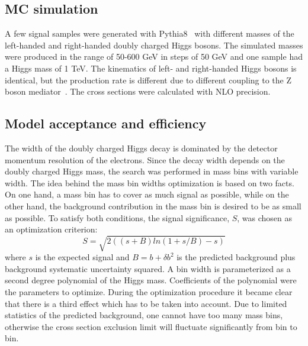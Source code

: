 \subsection{MC simulation}
A few signal samples were generated with Pythia8~\cite{pythia8} with different masses of the left-handed and right-handed doubly charged Higgs bosons.
The simulated masses were produced in the range of 50-600 GeV in steps of 50 GeV and one sample had a Higgs mass of 1 TeV.
The kinematics of left- and right-handed Higgs bosons is identical, but the production rate is different due to different coupling to the Z boson mediator~\cite{dch_note}. The cross sections were calculated with NLO precision. 

\subsection{Model acceptance and efficiency}
The width of the doubly charged Higgs decay is dominated by the detector momentum resolution of the electrons. Since the decay width depends on the doubly charged Higgs mass, the search was performed in mass bins with variable width.
The idea behind the mass bin widths optimization is based on two facts. On one hand, a mass bin has to cover as much signal as possible,
while on the other hand, the background contribution in the mass bin is desired to be as small as possible.
To satisfy both conditions, the signal significance, $S$, was chosen as an optimization criterion:
\begin{equation}
 S = \sqrt{ 2((s+B)ln(1+s/B)-s) } 
\end{equation}
where $s$ is the expected signal and $B=b+\delta b^2$ is the predicted background plus background systematic uncertainty squared.
A bin width is parameterized as a second degree polynomial of the Higgs mass.
Coefficients of the polynomial were the parameters to optimize.
During the optimization procedure it became clear that there is a third effect which has to be taken into account.
Due to limited statistics of the predicted background, one cannot have too many mass bins, otherwise the cross section
exclusion limit will fluctuate significantly from bin to bin. 

